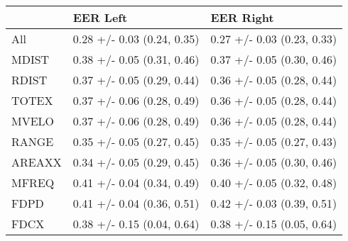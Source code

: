 \begin{tabular}{lll}
\toprule
{} &                    EER Left &                   EER Right \\
\midrule
All    &  0.28 +/- 0.03 (0.24, 0.35) &  0.27 +/- 0.03 (0.23, 0.33) \\
MDIST  &  0.38 +/- 0.05 (0.31, 0.46) &  0.37 +/- 0.05 (0.30, 0.46) \\
RDIST  &  0.37 +/- 0.05 (0.29, 0.44) &  0.36 +/- 0.05 (0.28, 0.44) \\
TOTEX  &  0.37 +/- 0.06 (0.28, 0.49) &  0.36 +/- 0.05 (0.28, 0.44) \\
MVELO  &  0.37 +/- 0.06 (0.28, 0.49) &  0.36 +/- 0.05 (0.28, 0.44) \\
RANGE  &  0.35 +/- 0.05 (0.27, 0.45) &  0.35 +/- 0.05 (0.27, 0.43) \\
AREAXX &  0.34 +/- 0.05 (0.29, 0.45) &  0.36 +/- 0.05 (0.30, 0.46) \\
MFREQ  &  0.41 +/- 0.04 (0.34, 0.49) &  0.40 +/- 0.05 (0.32, 0.48) \\
FDPD   &  0.41 +/- 0.04 (0.36, 0.51) &  0.42 +/- 0.03 (0.39, 0.51) \\
FDCX   &  0.38 +/- 0.15 (0.04, 0.64) &  0.38 +/- 0.15 (0.05, 0.64) \\
\bottomrule
\end{tabular}
